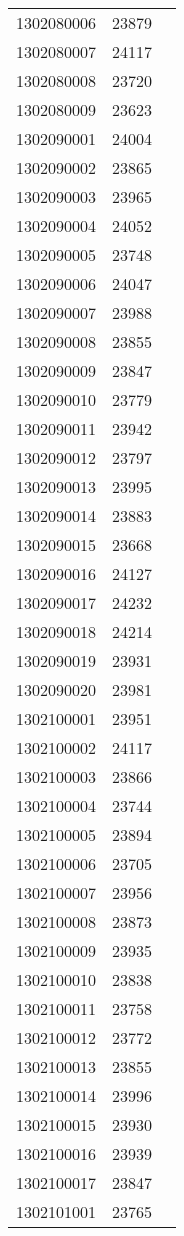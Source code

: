 \begin{longtable}[h]{lcc}
		1302080006 & 23879\\
		1302080007 & 24117\\
		1302080008 & 23720\\
		1302080009 & 23623\\
		1302090001 & 24004\\
		1302090002 & 23865\\
		1302090003 & 23965\\
		1302090004 & 24052\\
		1302090005 & 23748\\
		1302090006 & 24047\\
		1302090007 & 23988\\
		1302090008 & 23855\\
		1302090009 & 23847\\
		1302090010 & 23779\\
		1302090011 & 23942\\
		1302090012 & 23797\\
		1302090013 & 23995\\
		1302090014 & 23883\\
		1302090015 & 23668\\
		1302090016 & 24127\\
		1302090017 & 24232\\
		1302090018 & 24214\\
		1302090019 & 23931\\
		1302090020 & 23981\\
		1302100001 & 23951\\
		1302100002 & 24117\\
		1302100003 & 23866\\
		1302100004 & 23744\\
		1302100005 & 23894\\
		1302100006 & 23705\\
		1302100007 & 23956\\
		1302100008 & 23873\\
		1302100009 & 23935\\
		1302100010 & 23838\\
		1302100011 & 23758\\
		1302100012 & 23772\\
		1302100013 & 23855\\
		1302100014 & 23996\\
		1302100015 & 23930\\
		1302100016 & 23939\\
		1302100017 & 23847\\
		1302101001 & 23765\\

\end{longtable}
